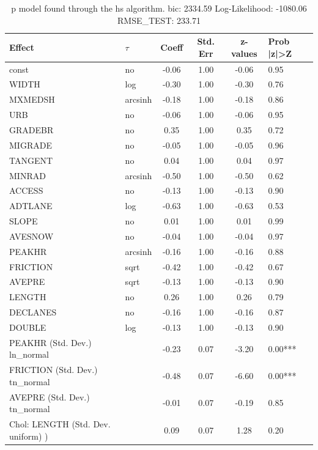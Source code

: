 \begin{table}
	\caption{p model found through the hs algorithm. bic: 2334.59 Log-Likelihood: -1080.06 RMSE_TEST: 233.71}
	\begin{center}
		\begin{tabular}{|l|l|c|c|c|l|}
			\hline
			Effect & $\tau$ & Coeff & Std. Err & z-values & Prob |z|>Z \\
			\hline
			const & no & -0.06 & 1.00 & -0.06 & 0.95 \\
			\hline
			WIDTH & log & -0.30 & 1.00 & -0.30 & 0.76 \\
			\hline
			MXMEDSH & arcsinh & -0.18 & 1.00 & -0.18 & 0.86 \\
			\hline
			URB & no & -0.06 & 1.00 & -0.06 & 0.95 \\
			\hline
			GRADEBR & no & 0.35 & 1.00 & 0.35 & 0.72 \\
			\hline
			MIGRADE & no & -0.05 & 1.00 & -0.05 & 0.96 \\
			\hline
			TANGENT & no & 0.04 & 1.00 & 0.04 & 0.97 \\
			\hline
			MINRAD & arcsinh & -0.50 & 1.00 & -0.50 & 0.62 \\
			\hline
			ACCESS & no & -0.13 & 1.00 & -0.13 & 0.90 \\
			\hline
			ADTLANE & log & -0.63 & 1.00 & -0.63 & 0.53 \\
			\hline
			SLOPE & no & 0.01 & 1.00 & 0.01 & 0.99 \\
			\hline
			AVESNOW & no & -0.04 & 1.00 & -0.04 & 0.97 \\
			\hline
			PEAKHR & arcsinh & -0.16 & 1.00 & -0.16 & 0.88 \\
			\hline
			FRICTION & sqrt & -0.42 & 1.00 & -0.42 & 0.67 \\
			\hline
			AVEPRE & sqrt & -0.13 & 1.00 & -0.13 & 0.90 \\
			\hline
			LENGTH & no & 0.26 & 1.00 & 0.26 & 0.79 \\
			\hline
			DECLANES & no & -0.16 & 1.00 & -0.16 & 0.87 \\
			\hline
			DOUBLE & log & -0.13 & 1.00 & -0.13 & 0.90 \\
			\hline
			PEAKHR (Std. Dev.) ln_normal &  & -0.23 & 0.07 & -3.20 & 0.00*** \\
			\hline
			FRICTION (Std. Dev.) tn_normal &  & -0.48 & 0.07 & -6.60 & 0.00*** \\
			\hline
			AVEPRE (Std. Dev.) tn_normal &  & -0.01 & 0.07 & -0.19 & 0.85 \\
			\hline
			 Chol: LENGTH (Std. Dev. uniform) ) &  & 0.09 & 0.07 & 1.28 & 0.20 \\

\end{tabular}
\end{center}
\end{table}
